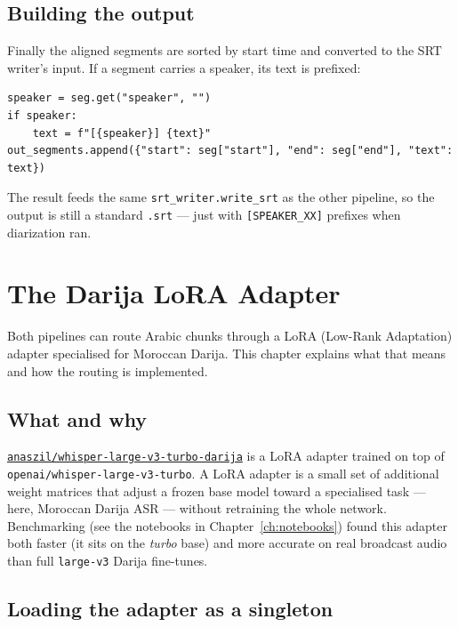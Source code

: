 \documentclass[11pt,a4paper]{report}
\newcommand{\code}[1]{\texttt{\small #1}}
\begin{document}
\section{Building the output}

Finally the aligned segments are sorted by start time and converted to the SRT
writer's input. If a segment carries a speaker, its text is prefixed:

\begin{lstlisting}[caption={Speaker-prefixed cue construction.}]
speaker = seg.get("speaker", "")
if speaker:
    text = f"[{speaker}] {text}"
out_segments.append({"start": seg["start"], "end": seg["end"], "text": text})
\end{lstlisting}

The result feeds the same \code{srt\_writer.write\_srt} as the other pipeline, so
the output is still a standard \texttt{.srt} --- just with \code{[SPEAKER\_XX]}
prefixes when diarization ran.

\chapter{The Darija LoRA Adapter}
\label{ch:lora}

Both pipelines can route Arabic chunks through a LoRA (Low-Rank Adaptation)
adapter specialised for Moroccan Darija. This chapter explains what that means and
how the routing is implemented.

\section{What and why}

\href{https://huggingface.co/anaszil/whisper-large-v3-turbo-darija}{\code{anaszil/whisper-large-v3-turbo-darija}}
is a LoRA adapter trained on top of \code{openai/whisper-large-v3-turbo}. A LoRA
adapter is a small set of additional weight matrices that adjust a frozen base
model toward a specialised task --- here, Moroccan Darija ASR --- without retraining
the whole network. Benchmarking (see the notebooks in Chapter~\ref{ch:notebooks})
found this adapter both faster (it sits on the \emph{turbo} base) and more
accurate on real broadcast audio than full \code{large-v3} Darija fine-tunes.

\section{Loading the adapter as a singleton}
\end{document}
